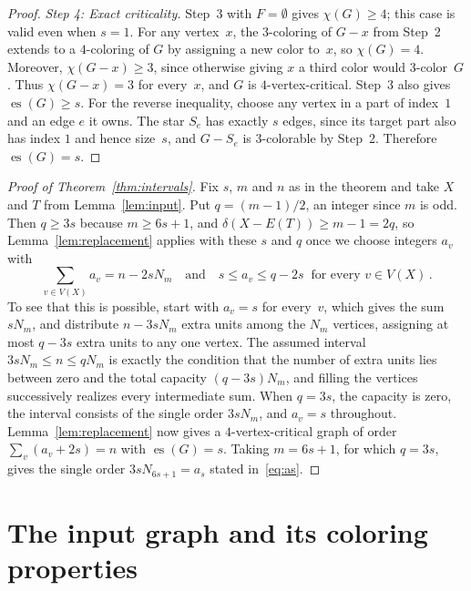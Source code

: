 \documentclass[11pt,letterpaper]{article}
\numberwithin{equation}{section}
\theoremstyle{plain}
\theoremstyle{definition}
\theoremstyle{remark}
\DeclareMathOperator{\es}{es}
\newcommand{\N}[1]{N_{#1}}
\begin{document}
\begin{proof}
\emph{Step 4: Exact criticality.}
Step~3 with $F=\emptyset$ gives $\chi(G)\ge 4$; this case is valid even when $s=1$. For any vertex~$x$, the $3$-coloring of $G-x$ from Step~2 extends to a $4$-coloring of $G$ by assigning a new color to~$x$, so $\chi(G)=4$. Moreover, $\chi(G-x)\ge 3$, since otherwise giving $x$ a third color would $3$-color~$G$. Thus $\chi(G-x)=3$ for every~$x$, and $G$ is $4$-vertex-critical. Step~3 also gives $\es(G)\ge s$. For the reverse inequality, choose any vertex in a part of index~$1$ and an edge $e$ it owns. The star $S_e$ has exactly $s$ edges, since its target part also has index $1$ and hence size~$s$, and $G-S_e$ is $3$-colorable by Step~2. Therefore $\es(G)=s$.
\end{proof}

\begin{proof}[Proof of Theorem~\ref{thm:intervals}]
Fix $s$, $m$ and $n$ as in the theorem and take $X$ and $T$ from Lemma~\ref{lem:input}. Put $q=(m-1)/2$, an integer since $m$ is odd. Then $q\ge 3s$ because $m\ge 6s+1$, and $\delta(X-E(T))\ge m-1=2q$, so Lemma~\ref{lem:replacement} applies with these $s$ and $q$ once we choose integers $a_v$ with
\begin{equation*}
  \sum_{v\in V(X)}a_v=n-2s\N{m}\quad\mbox{and}\quad s\le a_v\le q-2s\ \text{ for every } v\in V(X)\,.
\end{equation*}
To see that this is possible, start with $a_v=s$ for every~$v$, which gives the sum $s\N{m}$, and distribute $n-3s\N{m}$ extra units among the $\N{m}$ vertices, assigning at most $q-3s$ extra units to any one vertex. The assumed interval $3s\N{m}\le n\le q\N{m}$ is exactly the condition that the number of extra units lies between zero and the total capacity $(q-3s)\N{m}$, and filling the vertices successively realizes every intermediate sum. When $q=3s$, the capacity is zero, the interval consists of the single order $3s\N{m}$, and $a_v=s$ throughout. Lemma~\ref{lem:replacement} now gives a $4$-vertex-critical graph of order $\sum_v(a_v+2s)=n$ with $\es(G)=s$. Taking $m=6s+1$, for which $q=3s$, gives the single order $3s\N{6s+1}=a_s$ stated in~\eqref{eq:as}.
\end{proof}

\section{The input graph and its coloring properties}\label{sec:input}
\end{document}
